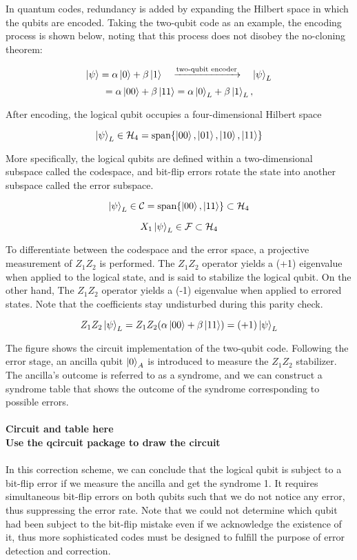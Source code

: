 In quantum codes, redundancy is added by expanding the Hilbert space in which the qubits are encoded. Taking the two-qubit code as an example, the encoding process is shown below, noting that this process does not disobey the no-cloning theorem:

\[
    \ket{\psi} = \alpha \ket{0} + \beta \ket{1}
    \quad
    \xrightarrow{\text{two-qubit encoder}}
    \quad
    \ket{\psi}_L
\]
\[
    = \alpha \ket{00} + \beta \ket{11} = \alpha \ket{0}_L + \beta \ket{1}_L,
\]

After encoding, the logical qubit occupies a four-dimensional Hilbert space

\[
    \ket{\psi}_L \in \mathcal{H}_4 = \text{span}\{\ket{00}, \ket{01}, \ket{10}, \ket{11}\}
\]

More specifically, the logical qubits are defined within a two-dimensional subspace called the codespace, and bit-flip errors rotate the state into another subspace called the error subspace.

\[
    \ket{\psi}_L \in \mathcal{C} = \text{span}\{\ket{00}, \ket{11}\} \subset \mathcal{H}_4
\]

\[
    X_1 \ket{\psi}_L \in \mathcal{F} \subset \mathcal{H}_4
\]

To differentiate between the codespace and the error space, a projective measurement of $Z_1Z_2$ is performed. The $Z_1Z_2$ operator yields a (+1) eigenvalue when applied to the logical state, and is said to stabilize the logical qubit. On the other hand, The $Z_1Z_2$ operator yields a (-1) eigenvalue when applied to errored states. Note that the coefficients stay undisturbed during this parity check.

\[
    Z_1Z_2\ket{\psi}_L = Z_1Z_2(\alpha \ket{00} + \beta \ket{11}) = (+1) \ket{\psi}_L
\]

The figure shows the circuit implementation of the two-qubit code. Following the error stage, an ancilla qubit $\ket{0}_A$ is introduced to measure the $Z_1Z_2$ stabilizer. The ancilla's outcome is referred to as a syndrome, and we can construct a syndrome table that shows the outcome of the syndrome corresponding to possible errors.
\\
\\
\textbf{Circuit and table here}
\\
\textbf{Use the qcircuit package to draw the circuit}
\\
\\
In this correction scheme, we can conclude that the logical qubit is subject to a bit-flip error if we measure the ancilla and get the syndrome 1. It requires simultaneous bit-flip errors on both qubits such that we do not notice any error, thus suppressing the error rate. Note that we could not determine which qubit had been subject to the bit-flip mistake even if we acknowledge the existence of it, thus more sophisticated codes must be designed to fulfill the purpose of error detection and correction.
